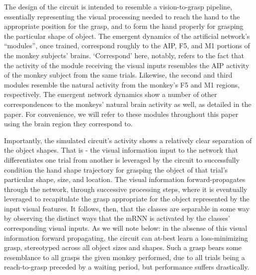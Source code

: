 \documentclass[12pt]{iopart}
\begin{document}
The design of the circuit is intended to resemble a vision-to-grasp pipeline, essentially
representing the visual processing needed to reach the hand to the appropriate position for
the grasp, and to form the hand properly for grasping the particular shape of object. The
emergent dynamics of the artificial network's ``modules'', once trained, correspond roughly
to the AIP, F5, and M1 portions of the monkey subjects' brains. `Correspond' here, notably,
refers to the fact that the activity of the module receiving the visual inputs resembles
the AIP activity of the monkey subject from the same trials. Likewise, the second and
third modules resemble the natural activity from the monkey's F5 and M1 regions, respectively.
The emergent network dynamics show a number of other correspondences to the monkeys' natural
brain activity as well, as detailed in the paper. For convenience, we will refer to these
modules throughout this paper using the brain region they correspond to.

Importantly, the simulated circuit's activity shows a relatively clear separation of the
object shapes. That is - the visual information input to the network that differentiates
one trial from another is leveraged by the circuit to successfully condition
the hand shape trajectory for grasping the object of that trial's particular shape, size, and
location. The visual information forward-propagates through the network, through successive
processing steps, where it is eventually leveraged to recapitulate the grasp appropriate
for the object represented by the input visual features. It follows, then, that the classes
are separable in some way by observing the distinct ways that the mRNN is activated by the
classes' corresponding visual inputs. As we will note below: in the absense of this
visual information forward propagating, the circuit can at-best learn a loss-minimizing grasp,
stereotyped across all object sizes and shapes. Such a grasp bears some resemblance to all
grasps the given monkey performed, due to all trials being a reach-to-grasp preceded by a
waiting period, but performance suffers drastically.
\end{document}
